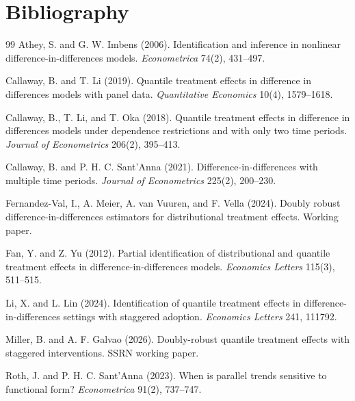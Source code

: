 \documentclass[11pt]{article}
\theoremstyle{definition}
\theoremstyle{plain}
\theoremstyle{remark}
\begin{document}
\section*{Bibliography}
\begin{thebibliography}{99}
Athey, S. and G. W. Imbens (2006).
Identification and inference in nonlinear difference-in-differences models.
\emph{Econometrica} 74(2), 431--497.

Callaway, B. and T. Li (2019).
Quantile treatment effects in difference in differences models with panel data.
\emph{Quantitative Economics} 10(4), 1579--1618.

Callaway, B., T. Li, and T. Oka (2018).
Quantile treatment effects in difference in differences models under dependence
restrictions and with only two time periods.
\emph{Journal of Econometrics} 206(2), 395--413.

Callaway, B. and P. H. C. Sant'Anna (2021).
Difference-in-differences with multiple time periods.
\emph{Journal of Econometrics} 225(2), 200--230.

Fernandez-Val, I., A. Meier, A. van Vuuren, and F. Vella (2024).
Doubly robust difference-in-differences estimators for distributional treatment
effects.
Working paper.

Fan, Y. and Z. Yu (2012).
Partial identification of distributional and quantile treatment effects in
difference-in-differences models.
\emph{Economics Letters} 115(3), 511--515.

Li, X. and L. Lin (2024).
Identification of quantile treatment effects in difference-in-differences
settings with staggered adoption.
\emph{Economics Letters} 241, 111792.

Miller, B. and A. F. Galvao (2026).
Doubly-robust quantile treatment effects with staggered interventions.
SSRN working paper.

Roth, J. and P. H. C. Sant'Anna (2023).
When is parallel trends sensitive to functional form?
\emph{Econometrica} 91(2), 737--747.
\end{thebibliography}
\end{document}
